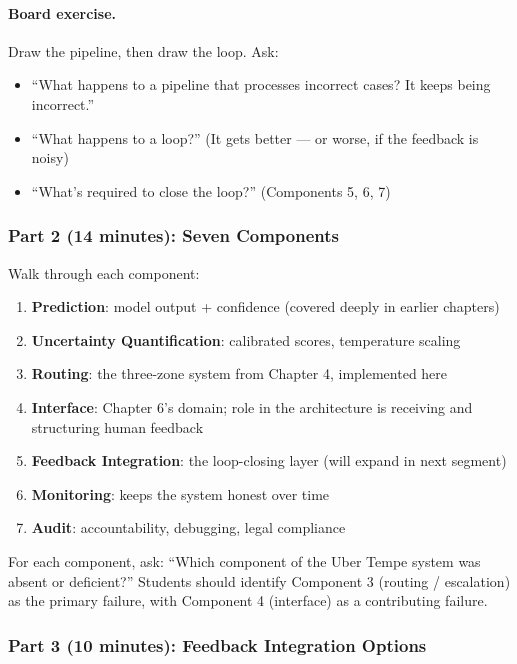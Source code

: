 \paragraph{Board exercise.}
Draw the pipeline, then draw the loop. Ask:
\begin{itemize}
    \item ``What happens to a pipeline that processes incorrect cases? It keeps being incorrect.''
    \item ``What happens to a loop?'' (It gets better --- or worse, if the feedback is noisy)
    \item ``What's required to close the loop?'' (Components 5, 6, 7)
\end{itemize}

\subsubsection{Part 2 (14 minutes): Seven Components}

Walk through each component:
\begin{enumerate}
    \item \textbf{Prediction}: model output + confidence (covered deeply in earlier chapters)
    \item \textbf{Uncertainty Quantification}: calibrated scores, temperature scaling
    \item \textbf{Routing}: the three-zone system from Chapter 4, implemented here
    \item \textbf{Interface}: Chapter 6's domain; role in the architecture is receiving and structuring human feedback
    \item \textbf{Feedback Integration}: the loop-closing layer (will expand in next segment)
    \item \textbf{Monitoring}: keeps the system honest over time
    \item \textbf{Audit}: accountability, debugging, legal compliance
\end{enumerate}

\begin{trythis}
For each component, ask: ``Which component of the Uber Tempe system was absent or deficient?'' Students should identify Component 3 (routing / escalation) as the primary failure, with Component 4 (interface) as a contributing failure.
\end{trythis}

\subsubsection{Part 3 (10 minutes): Feedback Integration Options}

